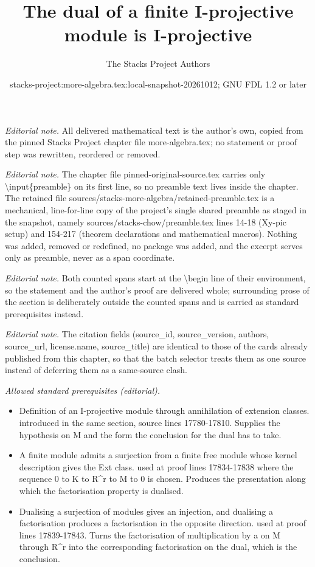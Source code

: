 \documentclass[10pt,a4paper]{amsart}
\title{The dual of a finite I-projective module is I-projective}
\author{The Stacks Project Authors}
\date{stacks-project:more-algebra.tex:local-snapshot-20261012; GNU FDL 1.2 or later}
\theoremstyle{plain}
\theoremstyle{definition}
\theoremstyle{remark}
\numberwithin{equation}{subsection}
\begin{document}
\maketitle
\setcounter{subsection}{1}
\noindent\textit{Editorial note.} All delivered mathematical text is the author's own, copied from the pinned Stacks Project chapter file more-algebra.tex; no statement or proof step was rewritten, reordered or removed.\par\medskip
\noindent\textit{Editorial note.} The chapter file pinned-original-source.tex carries only \textbackslash{}input\{preamble\} on its first line, so no preamble text lives inside the chapter. The retained file sources/stacks-more-algebra/retained-preamble.tex is a mechanical, line-for-line copy of the project's single shared preamble as staged in the snapshot, namely sources/stacks-chow/preamble.tex lines 14-18 (Xy-pic setup) and 154-217 (theorem declarations and mathematical macros). Nothing was added, removed or redefined, no package was added, and the excerpt serves only as preamble, never as a span coordinate.\par\medskip
\noindent\textit{Editorial note.} Both counted spans start at the \textbackslash{}begin line of their environment, so the statement and the author's proof are delivered whole; surrounding prose of the section is deliberately outside the counted spans and is carried as standard prerequisites instead.\par\medskip
\noindent\textit{Editorial note.} The citation fields (source\_id, source\_version, authors, source\_url, license.name, source\_title) are identical to those of the cards already published from this chapter, so that the batch selector treats them as one source instead of deferring them as a same-source clash.\par\medskip
\noindent\textit{Allowed standard prerequisites (editorial).}\begin{itemize}
\item Definition of an I-projective module through annihilation of extension classes. introduced in the same section, source lines 17780-17810. Supplies the hypothesis on M and the form the conclusion for the dual has to take.
\item A finite module admits a surjection from a finite free module whose kernel description gives the Ext class. used at proof lines 17834-17838 where the sequence 0 to K to R\textasciicircum{}r to M to 0 is chosen. Produces the presentation along which the factorisation property is dualised.
\item Dualising a surjection of modules gives an injection, and dualising a factorisation produces a factorisation in the opposite direction. used at proof lines 17839-17843. Turns the factorisation of multiplication by a on M through R\textasciicircum{}r into the corresponding factorisation on the dual, which is the conclusion.
\end{itemize}\medskip
\end{document}
